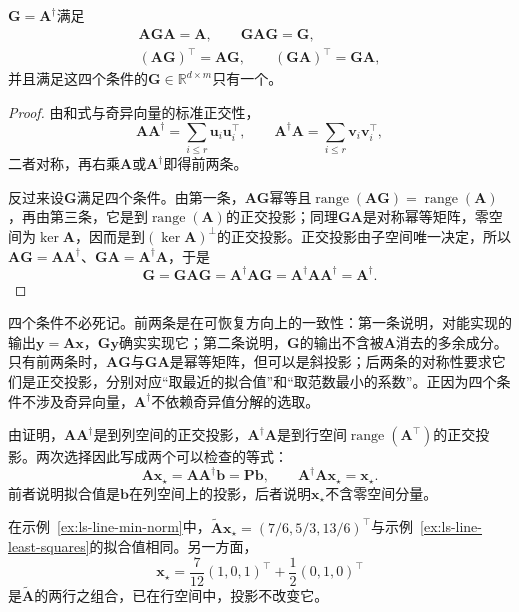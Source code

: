 \begin{theorem}[Penrose条件]
\label{thm:ls-penrose-conditions}
$\bm G=\bm A^\dagger$满足
\begin{equation}
\begin{gathered}
\bm A\bm G\bm A=\bm A,\qquad
\bm G\bm A\bm G=\bm G,\\
(\bm A\bm G)^\top=\bm A\bm G,\qquad
(\bm G\bm A)^\top=\bm G\bm A ,
\end{gathered}
\label{eq:ls-penrose-conditions}
\end{equation}
并且满足这四个条件的$\bm G\in\mathbb R^{d\times m}$只有一个。
\end{theorem}
\begin{proof}
由和式与奇异向量的标准正交性，
\[
 \bm A\bm A^\dagger=\sum_{i\leq r}\bm u_i\bm u_i^\top,\qquad
 \bm A^\dagger\bm A=\sum_{i\leq r}\bm v_i\bm v_i^\top ,
\]
二者对称，再右乘$\bm A$或$\bm A^\dagger$即得前两条。

反过来设$\bm G$满足四个条件。由第一条，$\bm A\bm G$幂等且$\operatorname{range}(\bm A\bm G)=\operatorname{range}(\bm A)$，再由第三条，它是到$\operatorname{range}(\bm A)$的正交投影；同理$\bm G\bm A$是对称幂等矩阵，零空间为$\ker\bm A$，因而是到$(\ker\bm A)^\perp$的正交投影。正交投影由子空间唯一决定，所以$\bm A\bm G=\bm A\bm A^\dagger$、$\bm G\bm A=\bm A^\dagger\bm A$，于是
\[
 \bm G=\bm G\bm A\bm G=\bm A^\dagger\bm A\bm G=\bm A^\dagger\bm A\bm A^\dagger=\bm A^\dagger .
\]
\end{proof}

四个条件不必死记。前两条是在可恢复方向上的一致性：第一条说明，对能实现的输出$\bm y=\bm A\bm x$，$\bm G\bm y$确实实现它；第二条说明，$\bm G$的输出不含被$\bm A$消去的多余成分。只有前两条时，$\bm A\bm G$与$\bm G\bm A$是幂等矩阵，但可以是斜投影；后两条的对称性要求它们是正交投影，分别对应“取最近的拟合值”和“取范数最小的系数”。正因为四个条件不涉及奇异向量，$\bm A^\dagger$不依赖奇异值分解的选取。

由证明，$\bm A\bm A^\dagger$是到列空间的正交投影，$\bm A^\dagger\bm A$是到行空间$\operatorname{range}(\bm A^\top)$的正交投影。两次选择因此写成两个可以检查的等式：
\[
 \bm A\bm x_\star=\bm A\bm A^\dagger\bm b=\bm P\bm b,\qquad
 \bm A^\dagger\bm A\bm x_\star=\bm x_\star .
\]
前者说明拟合值是$\bm b$在列空间上的投影，后者说明$\bm x_\star$不含零空间分量。

在示例~\ref{ex:ls-line-min-norm}中，$\widetilde{\bm A}\bm x_\star=(7/6,5/3,13/6)^\top$与示例~\ref{ex:ls-line-least-squares}的拟合值相同。另一方面，
\[
 \bm x_\star=\frac7{12}(1,0,1)^\top+\frac12(0,1,0)^\top
\]
是$\widetilde{\bm A}$的两行之组合，已在行空间中，投影不改变它。

